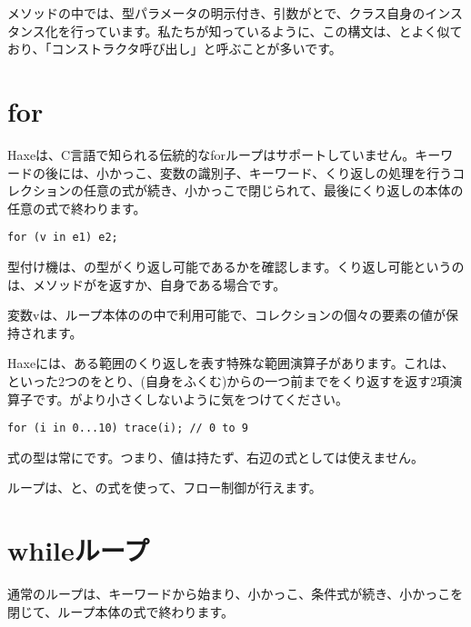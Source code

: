 
メソッドの中では、型パラメータの明示付き、引数がとで、クラス自身のインスタンス化を行っています。私たちが知っているように、この構文は、とよく似ており、「コンストラクタ呼び出し」と呼ぶことが多いです。

\section{for}
\label{expression-for}

Haxeは、C言語で知られる伝統的なforループはサポートしていません。キーワードの後には、小かっこ\expr{(}、変数の識別子、キーワード、くり返しの処理を行うコレクションの任意の式が続き、小かっこ\expr{)}で閉じられて、最後にくり返しの本体の任意の式で終わります。

\begin{lstlisting}
for (v in e1) e2;
\end{lstlisting}

型付け機は、の型がくり返し可能であるかを確認します。くり返し可能というのは、メソッドがを返すか、自身である場合です。

変数vは、ループ本体のの中で利用可能で、コレクションの個々の要素の値が保持されます。

Haxeには、ある範囲のくり返しを表す特殊な範囲演算子があります。これは、といった2つのをとり、(自身をふくむ)からの一つ前までをくり返すを返す2項演算子です。がより小さくしないように気をつけてください。

\begin{lstlisting}
for (i in 0...10) trace(i); // 0 to 9
\end{lstlisting}

式の型は常にです。つまり、値は持たず、右辺の式としては使えません。

ループは、と、の式を使って、フロー制御が行えます。

\section{whileループ}
\label{expression-while}

通常のループは、キーワードから始まり、小かっこ\expr{(}、条件式が続き、小かっこ\expr{)}を閉じて、ループ本体の式で終わります。

